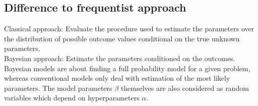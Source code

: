 \documentclass{article}
\begin{document}
\subsection{Difference to frequentist approach}
Classical approach: Evaluate the procedure used to estimate the parameters over the distribution of possible outcome values conditional on the true unknown parameters.
\\
Bayesian approach: Estimate the parameters conditioned on the outcomes.
\cite{1439840954}
\\
Bayesian models are about finding a full probability model for a given problem, whereas conventional models only deal with estimation of the most likely parameters.
The model parameters $\beta$ themselves are also considered as random variables which depend on hyperparameters $\alpha$.
\end{document}
